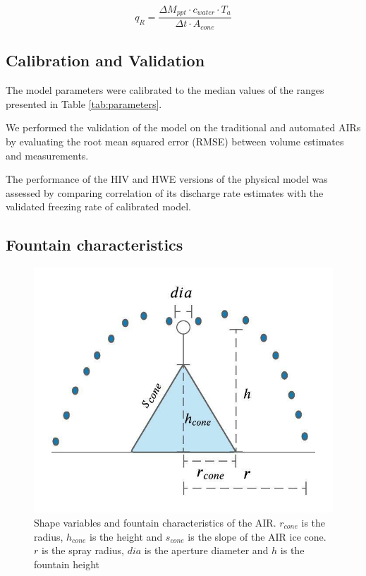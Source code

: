 \documentclass[tc, manuscript]{copernicus}
\begin{document}
\begin{equation}
  q_{R} = \frac{\Delta M_{ppt} \cdot c_{water} \cdot T_{a}}{\Delta t \cdot A_{cone}}
\end{equation}

\subsection{Calibration and Validation}

The model parameters were calibrated to the median values of the ranges presented in Table \ref{tab:parameters}.

We performed the validation of the model on the traditional and automated AIRs by evaluating the root mean
squared error (RMSE) between volume estimates and measurements. 

The performance of the HIV and HWE versions of the physical model was assessed by comparing correlation of its
discharge rate estimates with the validated freezing rate of calibrated model.

\subsection{Fountain characteristics}

\begin{figure}[t]
\includegraphics[width=12cm]{Figures/Fountain characteristics.jpeg}

\caption{Shape variables and fountain characteristics of the AIR. $r_{cone}$ is the radius, $h_{cone}$ is the
height and $s_{cone}$ is the slope of the AIR ice cone. $r$ is the spray radius, $dia$ is the aperture diameter
and $h$ is the fountain height}

\label{fig:fchar}
\end{figure}
\end{document}
